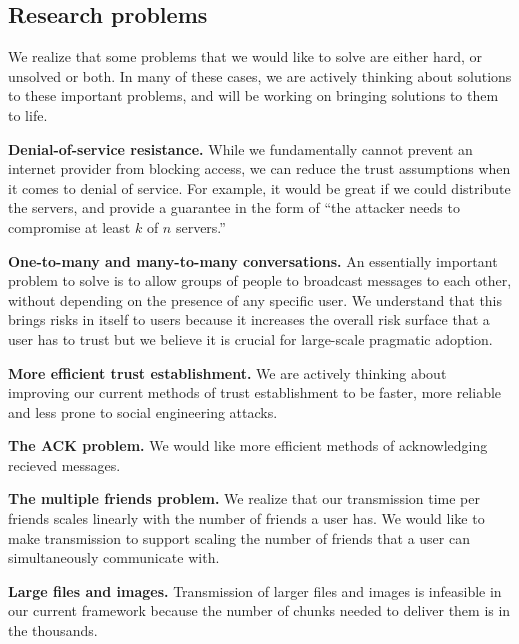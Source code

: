 \subsection{Research problems} 
We realize that some problems that we would like to solve are either hard, or unsolved or both. In many of these cases, we are actively thinking about solutions to these important problems, and will be working on bringing solutions to them to life.

\textbf{Denial-of-service resistance.} While we fundamentally cannot prevent an internet provider from blocking access, we can reduce the trust assumptions when it comes to denial of service. For example, it would be great if we could distribute the servers, and provide a guarantee in the form of ``the attacker needs to compromise at least $k$ of $n$ servers.''

\textbf{One-to-many and many-to-many conversations.} An essentially important problem to solve is to allow groups of people to broadcast messages to each other, without depending on the presence of any specific user. We understand that this brings risks in itself to users because it increases the overall risk surface that a user has to trust but we believe it is crucial for large-scale pragmatic adoption.

\textbf{More efficient trust establishment.} We are actively thinking about improving our current methods of trust establishment to be faster, more reliable and less prone to social engineering attacks.

\textbf{The ACK problem.} We would like more efficient methods of acknowledging recieved messages.

\textbf{The multiple friends problem.} We realize that our transmission time per friends scales linearly with the number of friends a user has. We would like to make transmission to support scaling the number of friends that a user can simultaneously communicate with.

\textbf{Large files and images.} Transmission of larger files and images is infeasible in our current framework because the number of chunks needed to deliver them is in the thousands.
